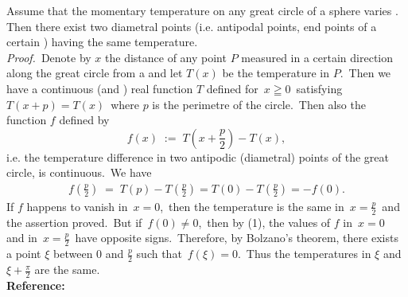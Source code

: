 \documentclass[12pt]{article}
\theoremstyle{definition}
\begin{document}
Assume that the momentary temperature on any great circle of a sphere varies .\, Then there exist two diametral points (i.e. antipodal points, end points of a certain ) having the same temperature.\\

{\em Proof.}\, Denote by $x$ the distance of any point $P$ measured in a certain direction along the great circle from a  and let $T(x)$ be the temperature in $P$.\, Then we have a continuous (and ) real function $T$ defined for \,$x \geqq 0$\, satisfying \,$T(x\!+\!p) = T(x)$\, where 
$p$ is the perimetre of the circle.\, Then also the function $f$ defined by
                 $$f(x) \;:=\; T\left(x\!+\!\frac{p}{2}\right)-T(x),$$
i.e. the temperature difference in two antipodic (diametral) points of the great circle, is continuous.\, We have
\begin{align}
f\left(\frac{p}{2}\right) \;=\; T(p)-T\left(\frac{p}{2}\right) = T(0)-T\left(\frac{p}{2}\right) = -f(0).
\end{align}
If $f$ happens to vanish in\, $x = 0$,\, then the temperature is the same in\, $x = \frac{p}{2}$\, and the assertion proved.\, But if\, $f(0) \neq 0$,\, then by (1), the values of $f$ in\, $x = 0$\, and in\, $x = \frac{p}{2}$\, have opposite signs.\, Therefore, by Bolzano's theorem, there exists a point $\xi$ between $0$ and $\frac{p}{2}$ such that\, $f(\xi) = 0$.\, Thus the temperatures in $\xi$ and $\xi\!+\!\frac{\pi}{2}$ are the same.\\


\textbf{Reference:}\; 
\end{document}
